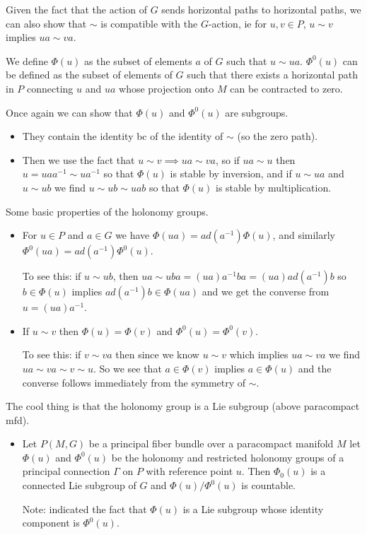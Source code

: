 \documentclass{report}
\theoremstyle{definition}
\begin{document}
\begin{itemize}
    Given the fact that the action of $G$ sends horizontal paths to horizontal paths, we can also show that $\sim$ is compatible with the $G$-action, ie for $u,v\in P$, $u\sim v$ implies $ua\sim va$.

    We define $\Phi(u)$ as the subset of elements $a$ of $G$ such that $u\sim ua$. $\Phi^0(u)$ can be defined as the subset of elements of $G$ such that there exists a horizontal path in $P$ connecting $u$ and $ua$ whose projection onto $M$ can be contracted to zero.

    Once again we can show that $\Phi(u)$ and $\Phi^0(u)$ are subgroups.
    \begin{itemize}
        \item They contain the identity bc of the identity of $\sim$ (so the zero path).
        \item Then we use the fact that $u\sim v\implies ua\sim va$, so if $ua\sim u$ then $u=uaa^{-1}\sim ua^{-1}$ so that $\Phi(u)$ is stable by inversion, and if $u\sim ua$ and $u\sim ub$ we find $u\sim ub\sim uab$ so that $\Phi(u)$ is stable by multiplication.
    \end{itemize}
\end{itemize}

Some basic properties of the holonomy groups.
\begin{itemize}
    \item For $u\in P$ and $a\in G$ we have $\Phi(ua)=ad(a^{-1})\Phi(u)$, and similarly $\Phi^{0}(ua)=ad(a^{-1})\Phi^0(u)$.
    
    To see this: if $u\sim ub$, then $ua\sim uba=(ua)a^{-1}ba=(ua)ad(a^{-1})b$ so $b\in\Phi(u)$ implies $ad(a^{-1})b\in\Phi(ua)$ and we get the converse from $u=(ua)a^{-1}$. 
    \item If $u\sim v$ then $\Phi(u)=\Phi(v)$ and $\Phi^0(u)=\Phi^0(v)$.

    To see this: if $v\sim va$ then since we know $u\sim v$ which implies $ua\sim va$ we find $ua\sim va\sim v\sim u$. So we see that $a\in\Phi(v)$ implies $a\in\Phi(u)$ and the converse follows immediately from the symmetry of $\sim$.
\end{itemize}

The cool thing is that the holonomy group is a Lie subgroup (above paracompact mfd).
\begin{itemize}
    \item Let $P(M,G)$ be a principal fiber bundle over a paracompact manifold $M$ let $\Phi(u)$ and $\Phi^0(u)$ be the holonomy and restricted holonomy groups of a principal connection $\Gamma$ on $P$ with reference point $u$. Then $\Phi_0(u)$ is a connected Lie subgroup of $G$ and $\Phi(u)/\Phi^0(u)$ is countable.

    Note: indicated the fact that $\Phi(u)$ is a Lie subgroup whose identity component is $\Phi^0(u)$.
\end{itemize}
\end{document}
